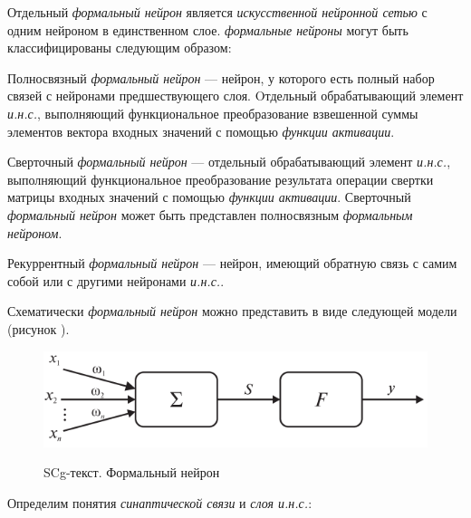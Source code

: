 Отдельный \textit{формальный нейрон} является \textit{искусственной нейронной сетью} с одним нейроном в единственном слое.
\textit{формальные нейроны} могут быть классифицированы следующим образом:
\begin{textitemize}
	\item Полносвязный \textit{формальный нейрон} --- нейрон, у которого есть полный набор связей с нейронами предшествующего слоя. Oтдельный обрабатывающий элемент \textit{и.н.с.}, выполняющий функциональное преобразование взвешенной суммы элементов вектора входных значений с помощью \textit{функции активации}.
	\item Сверточный \textit{формальный нейрон} --- отдельный обрабатывающий элемент \textit{и.н.с.}, выполняющий функциональное преобразование результата операции свертки матрицы входных значений с помощью \textit{функции активации}. Сверточный \textit{формальный нейрон} может быть представлен полносвязным \textit{формальным нейроном}.
	\item Рекуррентный \textit{формальный нейрон} --- нейрон, имеющий обратную связь с самим собой или с другими нейронами \textit{и.н.с.}.
\end{textitemize}

Схематически \textit{формальный нейрон} можно представить в виде следующей модели (рисунок \textit{}).

\begin{figure}[H]
	\caption{SCg-текст. Формальный нейрон}
	\includegraphics[scale=0.4]{author/part3/figures/formal_neuron.png}
	\label{fig:formal_neuron}
\end{figure}

Определим понятия \textit{синаптической связи} и \textit{слоя и.н.с.}:

\begin{SCn}

\end{SCn}


